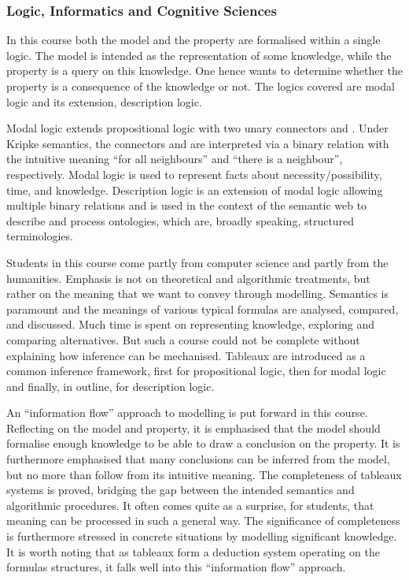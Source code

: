 \documentclass[a4paper,UKenglish]{lipics}
\begin{document}
\subsubsection{Logic, Informatics and Cognitive Sciences}
In this course both the model and the property are formalised within a single logic. The model is intended as the representation of some knowledge, while the property is a query on this knowledge. One hence wants to determine whether the property is a consequence of the knowledge or not. The logics covered are modal logic and its extension, description logic.

Modal logic extends propositional logic with two unary connectors  and . Under Kripke semantics, the connectors  and  are interpreted via a binary relation with the intuitive meaning ``for all neighbours'' and ``there is a neighbour'', respectively. Modal logic is used to represent facts about necessity/possibility, time, and knowledge. Description logic is an extension of modal logic allowing multiple binary relations and is used in the context of the semantic web to describe and process ontologies, which are, broadly speaking, structured terminologies.

Students in this course come partly from computer science and partly from the humanities. Emphasis is not on theoretical and algorithmic treatments, but rather on the meaning that we want to convey through modelling. Semantics is paramount and the meanings of various typical formulas are analysed, compared, and discussed. Much time is spent on representing knowledge, exploring and comparing alternatives. But such a course could not be complete without explaining how inference can be mechanised. Tableaux are introduced as a common inference framework, first for propositional logic, then for modal logic and finally, in outline, for description logic.

An ``information flow'' approach to modelling is put forward in this course. Reflecting on the model and property, it is emphasised that the model should formalise enough knowledge to be able to draw a conclusion on the property. It is furthermore emphasised that many conclusions can be inferred from the model, but no more than follow from its intuitive meaning. The completeness of tableaux systems is proved, bridging the gap between the intended semantics and algorithmic procedures. It often comes quite as a surprise, for students, that meaning can be processed in such a general way. The significance of completeness is furthermore stressed in concrete situations by modelling significant knowledge. It is worth noting that as tableaux form a deduction system operating on the formulas structures, it falls well into this ``information flow'' approach.
\end{document}
